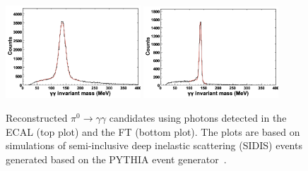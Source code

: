 \begin{figure}[t]
\centering
\includegraphics[width=0.45\textwidth]{pics/ecal_pi0.png}
\includegraphics[width=0.45\textwidth]{pics/ft_pi0.png}
\caption{Reconstructed $\pi^0 \to \gamma \gamma$ candidates using photons detected in the ECAL (top plot) and
  the FT (bottom plot). The plots are based on simulations of semi-inclusive deep inelastic scattering (SIDIS) events
  generated based on the PYTHIA event generator~\cite{clasdis}.}
\label{fig:pi0mass}
\end{figure}

